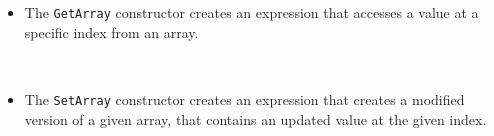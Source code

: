 \begin{itemize}
\begin{itemize}
        \item The \verb|GetArray| constructor creates an expression that accesses a value at a specific index from an array.
        \begin{code}
            \>[4]\AgdaSpace{}%
            \AgdaSymbol{:}\AgdaSpace{}%
            \AgdaSymbol{\{}\AgdaSpace{}%
            \AgdaSymbol{:}\AgdaSpace{}%
            \AgdaSymbol{\}}\AgdaSpace{}%
            \<%
            \\
            \>[4][@{}l@{\AgdaIndent{0}}]%
            \>[6]\AgdaSpace{}%
            \AgdaSpace{}%
            \AgdaSpace{}%
            \AgdaSpace{}%
            \AgdaSymbol{(}\AgdaSpace{}%
            \AgdaSymbol{)}\AgdaSpace{}%
            \AgdaSpace{}%
            \AgdaSpace{}%
            \<%
        \end{code}
        
        \item The \verb|SetArray| constructor creates an expression that creates a modified version of a given array, that contains an updated value at the given index.
        \begin{code}
            \>[4]\AgdaSpace{}%
            \AgdaSymbol{:}\AgdaSpace{}%
            \AgdaSymbol{\{}\AgdaSpace{}%
            \AgdaSymbol{:}\AgdaSpace{}%
            \AgdaSymbol{\}}\AgdaSpace{}%
            \<%
            \\
            \>[4][@{}l@{\AgdaIndent{0}}]%
            \>[6]\AgdaSpace{}%
            \AgdaSpace{}%
            \AgdaSpace{}%
            \AgdaSpace{}%
            \AgdaSpace{}%
            \AgdaSpace{}%
            \AgdaSpace{}%
            \AgdaSymbol{(}\AgdaSpace{}%
            \AgdaSymbol{)}\AgdaSpace{}%
            \<%
            \\
            \>[6]\AgdaSpace{}%
            \AgdaSymbol{(}\AgdaSpace{}%
            \AgdaSymbol{)}\<%
        \end{code}
        

\end{itemize}
\end{itemize}
